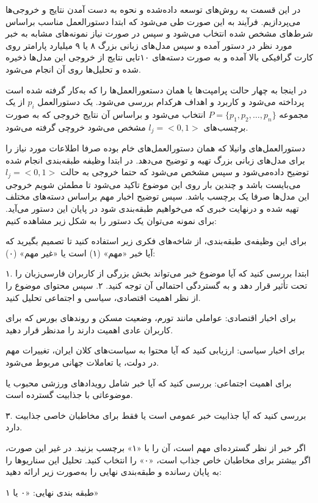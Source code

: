 
در این قسمت به روش‌های توسعه داده‌شده و نحوه به دست آمدن نتایج و خروجی‌ها می‌پردازیم. فرآیند به این صورت طی می‌شود که ابتدا دستورالعمل مناسب براساس شرط‌های مشخص شده انتخاب می‌شود و سپس در صورت نیاز نمونه‌های مشابه به خبر مورد نظر در دستور آمده و سپس مدل‌های زبانی‌ بزرگ ۸ یا ۹ میلیارد پارامتر روی کارت گرافیکی بالا آمده و به صورت دسته‌های ۱۰‌تایی نتایج از خروجی این مدل‌ها ذخیره شده و تحلیل‌ها روی آن انجام می‌شود.

در اینجا به چهار حالت پرامپت‌ها یا همان دستعورالعمل‌ها را که به‌کار گرفته شده است پرداخته می‌شود و کاربرد و اهداف هرکدام بررسی می‌شود. یک دستورالعمل
$p_i$
از یک مجموعه
$P = \{p_1, p_2, \ldots, p_n\}$
انتخاب می‌شود و براساس آن نتایج خروجی که به صورت برچسب‌های
$l_j = <0,1>$
مشخص می‌شود خروچی گرفته می‌شود.

دستورالعمل‌های وانیلا که همان دستورالعمل‌های خام بوده صرفا اطلاعات مورد نیاز را برای مدل‌های زبانی بزرگ تهیه و توضیح می‌دهد. در ابتدا وظیفه طبقه‌بندی انجام شده توضیح داده‌می‌شود و سپس مشخص می‌شود که حتما خروجی به حالت 
$l_j = <0,1>$
می‌بایست باشد و چندین بار روی این موضوع تاکید می‌شود تا مطمئن شویم خروجی این مدل‌ها صرفا یک برچسب باشد. سپس توضیح اخبار مهم براساس دسته‌های مختلف تهیه شده و درنهایت خبری که می‌خواهیم طبقه‌بندی شود در پایان این دستور می‌آید. برای نمونه می‌توان یک دستور را به شکل زیر مشاهده کنیم:

\vspace{5pt}
\begin{scriptsize}
\begin{itshape}
    برای این وظیفه‌ی طبقه‌بندی، از شاخه‌های فکری زیر استفاده کنید تا تصمیم بگیرید که آیا خبر «مهم» (۱) است یا «غیر مهم» (۰):

    ۱. ابتدا بررسی کنید که آیا موضوع خبر می‌تواند بخش بزرگی از کاربران فارسی‌زبان را تحت تأثیر قرار دهد و به گستردگی احتمالی آن توجه کنید.
    ۲. سپس محتوای موضوع را از نظر اهمیت اقتصادی، سیاسی و اجتماعی تحلیل کنید.
    
    برای اخبار اقتصادی: عواملی مانند تورم، وضعیت مسکن و روندهای بورس که برای کاربران عادی اهمیت دارند را مدنظر قرار دهید.
    
    برای اخبار سیاسی: ارزیابی کنید که آیا محتوا به سیاست‌های کلان ایران، تغییرات مهم در دولت، یا تعاملات جهانی مربوط می‌شود.
    
    برای اهمیت اجتماعی: بررسی کنید که آیا خبر شامل رویدادهای ورزشی محبوب یا موضوعاتی با جذابیت گسترده است.
    
    ۳. بررسی کنید که آیا جذابیت خبر عمومی است یا فقط برای مخاطبان خاصی جذابیت دارد.
    
    اگر خبر از نظر گسترده‌ای مهم است، آن را با «۱» برچسب بزنید. در غیر این صورت، اگر بیشتر برای مخاطبان خاص جذاب است، «۰» را انتخاب کنید. تحلیل این سناریوها را به پایان رسانده و طبقه‌بندی نهایی را به‌صورت زیر ارائه دهید:
    
    طبقه بندی نهایی: «۰ یا ۱»
\end{itshape}
\end{scriptsize}
\vspace{5pt}

